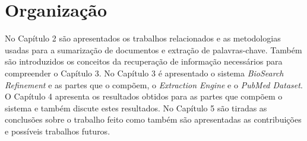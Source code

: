 \section{Organização}
No Capítulo 2 são apresentados os trabalhos relacionados e as metodologias usadas para a sumarização de documentos e extração de palavras-chave. Também são introduzidos os conceitos da recuperação de informação necessários para compreender o Capítulo 3. No Capítulo 3 é apresentado o sistema \emph{BioSearch Refinement} e as partes que o compõem, o \emph{Extraction Engine} e o \emph{PubMed Dataset}. O Capítulo 4  apresenta os resultados obtidos para as partes que compõem o sistema e também discute estes resultados. No Capítulo 5 são tiradas as conclusões sobre o trabalho feito como também são apresentadas as contribuições e possíveis trabalhos futuros.


